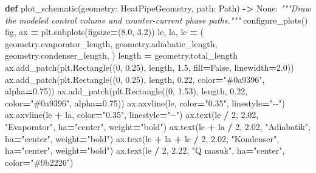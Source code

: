 \documentclass[
  12pt,a4paper,oneside]{report}
\newenvironment{Shaded}{\begin{snugshade}}{\end{snugshade}}
\newcommand{\CommentTok}[1]{\textcolor[rgb]{0.56,0.35,0.01}{\textit{#1}}}
\newcommand{\DecValTok}[1]{\textcolor[rgb]{0.00,0.00,0.81}{#1}}
\newcommand{\FloatTok}[1]{\textcolor[rgb]{0.00,0.00,0.81}{#1}}
\newcommand{\KeywordTok}[1]{\textcolor[rgb]{0.13,0.29,0.53}{\textbf{#1}}}
\newcommand{\NormalTok}[1]{#1}
\newcommand{\OperatorTok}[1]{\textcolor[rgb]{0.81,0.36,0.00}{\textbf{#1}}}
\newcommand{\StringTok}[1]{\textcolor[rgb]{0.31,0.60,0.02}{#1}}
\newcommand{\VariableTok}[1]{\textcolor[rgb]{0.00,0.00,0.00}{#1}}
\begin{document}
\begin{Shaded}
\begin{Highlighting}[]
\KeywordTok{def}\NormalTok{ plot\_schematic(geometry: HeatPipeGeometry, path: Path) }\OperatorTok{{-}\textgreater{}} \VariableTok{None}\NormalTok{:}
    \CommentTok{"""Draw the modeled control volume and counter{-}current phase paths."""}
\NormalTok{    configure\_plots()}
\NormalTok{    fig, ax }\OperatorTok{=}\NormalTok{ plt.subplots(figsize}\OperatorTok{=}\NormalTok{(}\FloatTok{8.0}\NormalTok{, }\FloatTok{3.2}\NormalTok{))}
\NormalTok{    le, la, lc }\OperatorTok{=}\NormalTok{ (}
\NormalTok{        geometry.evaporator\_length, geometry.adiabatic\_length,}
\NormalTok{        geometry.condenser\_length,}
\NormalTok{    )}
\NormalTok{    length }\OperatorTok{=}\NormalTok{ geometry.total\_length}
\NormalTok{    ax.add\_patch(plt.Rectangle((}\DecValTok{0}\NormalTok{, }\FloatTok{0.25}\NormalTok{), length, }\FloatTok{1.5}\NormalTok{, fill}\OperatorTok{=}\VariableTok{False}\NormalTok{, linewidth}\OperatorTok{=}\FloatTok{2.0}\NormalTok{))}
\NormalTok{    ax.add\_patch(plt.Rectangle((}\DecValTok{0}\NormalTok{, }\FloatTok{0.25}\NormalTok{), length, }\FloatTok{0.22}\NormalTok{, color}\OperatorTok{=}\StringTok{"\#0a9396"}\NormalTok{, alpha}\OperatorTok{=}\FloatTok{0.75}\NormalTok{))}
\NormalTok{    ax.add\_patch(plt.Rectangle((}\DecValTok{0}\NormalTok{, }\FloatTok{1.53}\NormalTok{), length, }\FloatTok{0.22}\NormalTok{, color}\OperatorTok{=}\StringTok{"\#0a9396"}\NormalTok{, alpha}\OperatorTok{=}\FloatTok{0.75}\NormalTok{))}
\NormalTok{    ax.axvline(le, color}\OperatorTok{=}\StringTok{"0.35"}\NormalTok{, linestyle}\OperatorTok{=}\StringTok{"{-}{-}"}\NormalTok{)}
\NormalTok{    ax.axvline(le }\OperatorTok{+}\NormalTok{ la, color}\OperatorTok{=}\StringTok{"0.35"}\NormalTok{, linestyle}\OperatorTok{=}\StringTok{"{-}{-}"}\NormalTok{)}
\NormalTok{    ax.text(le }\OperatorTok{/} \DecValTok{2}\NormalTok{, }\FloatTok{2.02}\NormalTok{, }\StringTok{"Evaporator"}\NormalTok{, ha}\OperatorTok{=}\StringTok{"center"}\NormalTok{, weight}\OperatorTok{=}\StringTok{"bold"}\NormalTok{)}
\NormalTok{    ax.text(le }\OperatorTok{+}\NormalTok{ la }\OperatorTok{/} \DecValTok{2}\NormalTok{, }\FloatTok{2.02}\NormalTok{, }\StringTok{"Adiabatik"}\NormalTok{, ha}\OperatorTok{=}\StringTok{"center"}\NormalTok{, weight}\OperatorTok{=}\StringTok{"bold"}\NormalTok{)}
\NormalTok{    ax.text(le }\OperatorTok{+}\NormalTok{ la }\OperatorTok{+}\NormalTok{ lc }\OperatorTok{/} \DecValTok{2}\NormalTok{, }\FloatTok{2.02}\NormalTok{, }\StringTok{"Kondenser"}\NormalTok{, ha}\OperatorTok{=}\StringTok{"center"}\NormalTok{, weight}\OperatorTok{=}\StringTok{"bold"}\NormalTok{)}
\NormalTok{    ax.text(le }\OperatorTok{/} \DecValTok{2}\NormalTok{, }\FloatTok{2.22}\NormalTok{, }\StringTok{"Q masuk"}\NormalTok{, ha}\OperatorTok{=}\StringTok{"center"}\NormalTok{, color}\OperatorTok{=}\StringTok{"\#9b2226"}\NormalTok{)}

\end{Highlighting}
\end{Shaded}
\end{document}
